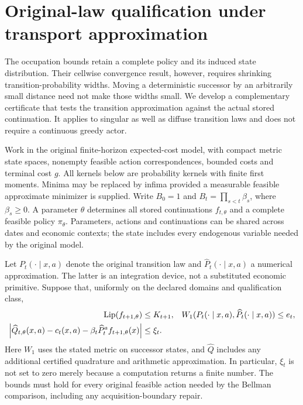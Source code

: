 \section{Original-law qualification under transport approximation}\label{sec:transport90}
The occupation bounds retain a complete policy and its induced state distribution. Their cellwise convergence result, however, requires shrinking transition-probability widths. Moving a deterministic successor by an arbitrarily small distance need not make those widths small. We develop a complementary certificate that tests the transition approximation against the actual stored continuation. It applies to singular as well as diffuse transition laws and does not require a continuous greedy actor.

Work in the original finite-horizon expected-cost model, with compact metric state spaces, nonempty feasible action correspondences, bounded costs and terminal cost $g$. All kernels below are probability kernels with finite first moments. Minima may be replaced by infima provided a measurable feasible approximate minimizer is supplied. Write $B_0=1$ and $B_t=\prod_{s<t}\beta_s$, where $\beta_s\ge0$. A parameter $\theta$ determines all stored continuations $f_{t,\theta}$ and a complete feasible policy $\pi_\theta$. Parameters, actions and continuations can be shared across dates and economic contexts; the state includes every endogenous variable needed by the original model.

Let $P_t(\cdot\mid x,a)$ denote the original transition law and $\widehat P_t(\cdot\mid x,a)$ a numerical approximation. The latter is an integration device, not a substituted economic primitive. Suppose that, uniformly on the declared domains and qualification class,
\begin{align}\label{eq:transport-input90}
 \operatorname{Lip}(f_{t+1,\theta})&\le K_{t+1},&
 W_1(P_t(\cdot\mid x,a),\widehat P_t(\cdot\mid x,a))&\le e_t,\notag\\
 \left|\widehat Q_{t,\theta}(x,a)-c_t(x,a)
 -\beta_t\widehat P_t^a f_{t+1,\theta}(x)\right|&\le\xi_t.&&
\end{align}
Here $W_1$ uses the stated metric on successor states, and $\widehat Q$ includes any additional certified quadrature and arithmetic approximation. In particular, $\xi_t$ is not set to zero merely because a computation returns a finite number. The bounds must hold for every original feasible action needed by the Bellman comparison, including any acquisition-boundary repair.

